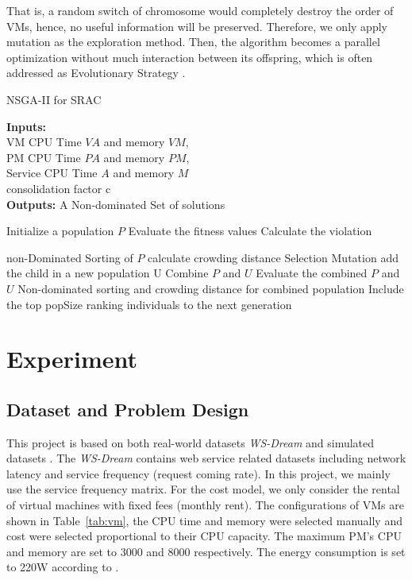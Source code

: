 That is, a random switch of chromosome would completely destroy the order of VMs, 
hence, no useful information will be preserved. 
Therefore, we only apply mutation as the exploration method. Then, the algorithm becomes a parallel optimization without much interaction between its offspring, which is often addressed as Evolutionary Strategy \cite{evo_str}.
\begin{algorithm}[!htb]
 \caption{NSGA-II for SRAC}
 \footnotesize
 \textbf{Inputs:} \\
  VM CPU Time $VA$ and memory $VM$, \\
  PM CPU Time $PA$ and memory $PM$, \\
  Service CPU Time $A$ and memory $M$ \\
  consolidation factor c \\
 \textbf{Outputs:}
  A Non-dominated Set of solutions

 \begin{algorithmic}[1]
  \STATE Initialize a population $P$
      \STATE Evaluate the fitness values
      \STATE Calculate the violation
    \ENDFOR

    \STATE non-Dominated Sorting of $P$
    \STATE calculate crowding distance
      \STATE Selection
      \STATE Mutation
      \STATE add the child in a new population U
    \ENDWHILE
    \STATE Combine $P$ and $U$ 
    \STATE Evaluate the combined $P$ and $U$
    \STATE Non-dominated sorting and crowding distance for combined population
    \STATE Include the top popSize ranking individuals to the next generation

  \ENDWHILE
 \end{algorithmic}
 \label{alg:NSGAII}
\end{algorithm}

\section{Experiment}
\label{sec:exp}
\subsection{Dataset and Problem Design}
This project is based on both real-world datasets \textit{WS-Dream} \cite{Service_dataset} and simulated datasets \cite{Energy_9}. 
The \textit{WS-Dream} contains web service related datasets including network latency and service frequency (request coming rate). In this project, we mainly use the service frequency matrix. For the cost model, we only consider the rental of virtual machines with fixed fees (monthly rent). The configurations of VMs are shown in Table~\ref{tab:vm}, the CPU time and memory were selected manually and cost were selected proportional to their CPU capacity. The maximum PM's CPU and memory are set to 3000 and 8000 respectively. The energy consumption is set to 220W according to \cite{Energy_9}.

